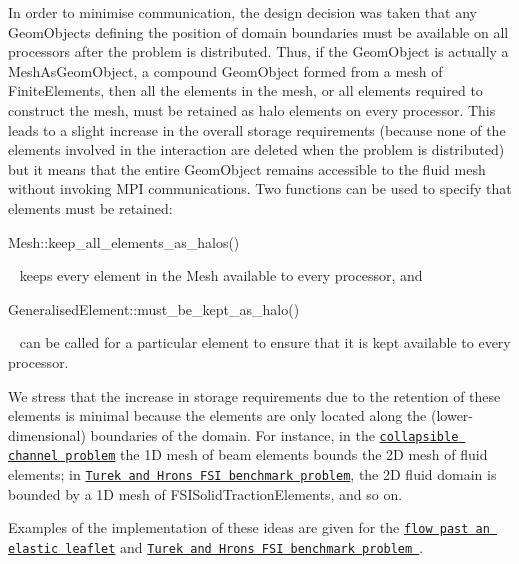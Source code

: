 In order to minimise communication, the design decision was taken that any {\ttfamily Geom\+Objects} defining the position of domain boundaries must be available on all processors after the problem is distributed. Thus, if the {\ttfamily Geom\+Object} is actually a {\ttfamily Mesh\+As\+Geom\+Object}, a compound {\ttfamily Geom\+Object} formed from a mesh of {\ttfamily Finite\+Elements}, then all the elements in the mesh, or all elements required to construct the mesh, must be retained as halo elements on every processor. This leads to a slight increase in the overall storage requirements (because none of the elements involved in the interaction are deleted when the problem is distributed) but it means that the entire {\ttfamily Geom\+Object} remains accessible to the fluid mesh without invoking M\+PI communications. Two functions can be used to specify that elements must be retained\+: ~\newline
~\newline

\begin{DoxyCode}
Mesh::keep\_all\_elements\_as\_halos()
\end{DoxyCode}
 ~\newline
keeps every element in the {\ttfamily Mesh} available to every processor, and 
\begin{DoxyCode}
GeneralisedElement::must\_be\_kept\_as\_halo()
\end{DoxyCode}
 ~\newline
can be called for a particular element to ensure that it is kept available to every processor.

We stress that the increase in storage requirements due to the retention of these elements is minimal because the elements are only located along the (lower-\/dimensional) boundaries of the domain. For instance, in the \href{../../../interaction/fsi_collapsible_channel_algebraic/html/index.html}{\tt collapsible channel problem} the 1D mesh of beam elements bounds the 2D mesh of fluid elements; in \href{../../../interaction/turek_flag/html/index.html}{\tt Turek and Hron\textquotesingle{}s F\+SI benchmark problem}, the 2D fluid domain is bounded by a 1D mesh of {\ttfamily F\+S\+I\+Solid\+Traction\+Elements}, and so on.

Examples of the implementation of these ideas are given for the \href{../../fsi_channel_with_leaflet/html/index.html}{\tt flow past an elastic leaflet} and \href{../../turek_flag/html/index.html}{\tt Turek and Hron\textquotesingle{}s F\+SI benchmark problem }.



